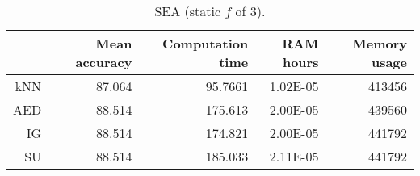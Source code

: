 \begin{table}[h]
\centering
\begin{tabular}{r|rrrr}	
    & Mean accuracy & Computation time & RAM hours & Memory usage \\ \hline
kNN & 87.064                   & 95.7661          & 1.02E-05  & 413456       \\
AED & 88.514                   & 175.613          & 2.00E-05  & 439560       \\
IG  & 88.514                   & 174.821          & 2.00E-05  & 441792       \\
SU  & 88.514                   & 185.033          & 2.11E-05  & 441792      
\end{tabular}
\caption{SEA (static $f$ of 3).}
\label{Table:SEA}
\end{table}